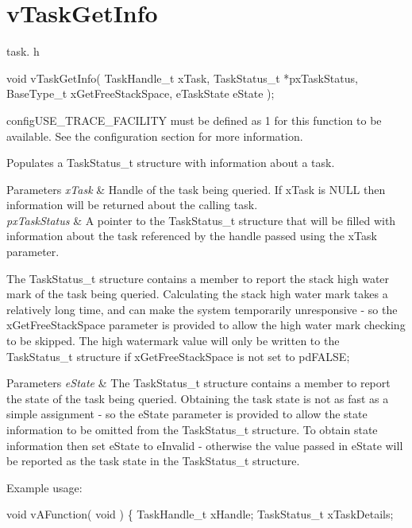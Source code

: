 \hypertarget{group__v_task_get_info}{}\section{v\+Task\+Get\+Info}
\label{group__v_task_get_info}
task. h 
\begin{DoxyPre}void vTaskGetInfo( TaskHandle\_t xTask, TaskStatus\_t *pxTaskStatus, BaseType\_t xGetFreeStackSpace, eTaskState eState );\end{DoxyPre}


config\+U\+S\+E\+\_\+\+T\+R\+A\+C\+E\+\_\+\+F\+A\+C\+I\+L\+I\+TY must be defined as 1 for this function to be available. See the configuration section for more information.

Populates a Task\+Status\+\_\+t structure with information about a task.


\begin{DoxyParams}{Parameters}
{\em x\+Task} & Handle of the task being queried. If x\+Task is N\+U\+LL then information will be returned about the calling task.\\
\hline
{\em px\+Task\+Status} & A pointer to the Task\+Status\+\_\+t structure that will be filled with information about the task referenced by the handle passed using the x\+Task parameter.\\
\hline
\end{DoxyParams}
The Task\+Status\+\_\+t structure contains a member to report the stack high water mark of the task being queried. Calculating the stack high water mark takes a relatively long time, and can make the system temporarily unresponsive -\/ so the x\+Get\+Free\+Stack\+Space parameter is provided to allow the high water mark checking to be skipped. The high watermark value will only be written to the Task\+Status\+\_\+t structure if x\+Get\+Free\+Stack\+Space is not set to pd\+F\+A\+L\+SE;


\begin{DoxyParams}{Parameters}
{\em e\+State} & The Task\+Status\+\_\+t structure contains a member to report the state of the task being queried. Obtaining the task state is not as fast as a simple assignment -\/ so the e\+State parameter is provided to allow the state information to be omitted from the Task\+Status\+\_\+t structure. To obtain state information then set e\+State to e\+Invalid -\/ otherwise the value passed in e\+State will be reported as the task state in the Task\+Status\+\_\+t structure.\\
\hline
\end{DoxyParams}
Example usage\+: 
\begin{DoxyPre}
void vAFunction( void )
\{
TaskHandle\_t xHandle;
TaskStatus\_t xTaskDetails;\end{DoxyPre}



